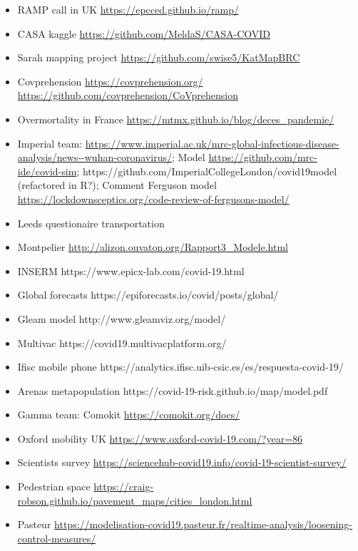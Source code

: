 \documentclass[10pt]{article}
\begin{document}
\begin{itemize}
	\item RAMP call in UK \url{https://epcced.github.io/ramp/}
	\item CASA kaggle \url{https://github.com/MeldaS/CASA-COVID}
	\item Sarah mapping project \url{https://github.com/swise5/KatMapBRC}
	\item Covprehension \url{https://covprehension.org/} \url{https://github.com/covprehension/CoVprehension}
	\item Overmortality in France \url{https://mtmx.github.io/blog/deces_pandemie/}
	\item Imperial team: \url{https://www.imperial.ac.uk/mrc-global-infectious-disease-analysis/news--wuhan-coronavirus/}; Model \url{https://github.com/mrc-ide/covid-sim}; https://github.com/ImperialCollegeLondon/covid19model (refactored in R?); Comment Ferguson model \url{https://lockdownsceptics.org/code-review-of-fergusons-model/}
	\item Leeds questionaire transportation %
	\item Montpelier \url{http://alizon.ouvaton.org/Rapport3_Modele.html}
	\item INSERM https://www.epicx-lab.com/covid-19.html
	\item Global forecasts https://epiforecasts.io/covid/posts/global/
	\item Gleam model http://www.gleamviz.org/model/
	\item Multivac https://covid19.multivacplatform.org/
	\item Ifisc mobile phone https://analytics.ifisc.uib-csic.es/es/respuesta-covid-19/
	\item Arenas metapopulation https://covid-19-risk.github.io/map/model.pdf
	\item Gamma team: Comokit \url{https://comokit.org/docs/}
	\item Oxford mobility UK \url{https://www.oxford-covid-19.com/?year=86}
	\item Scientists survey \url{https://sciencehub-covid19.info/covid-19-scientist-survey/}
	\item Pedestrian space \url{https://craig-robson.github.io/pavement_maps/cities_london.html}
	\item Pasteur \url{https://modelisation-covid19.pasteur.fr/realtime-analysis/loosening-control-measures/}
\end{itemize}
\end{document}
